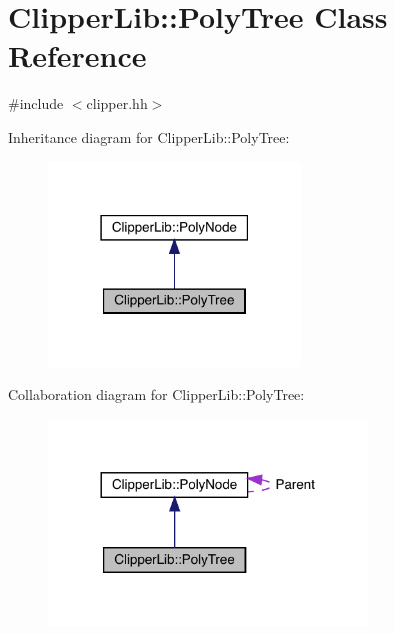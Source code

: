 \hypertarget{class_clipper_lib_1_1_poly_tree}{}\section{Clipper\+Lib\+::Poly\+Tree Class Reference}
\label{class_clipper_lib_1_1_poly_tree}


{\ttfamily \#include $<$clipper.\+hh$>$}



Inheritance diagram for Clipper\+Lib\+::Poly\+Tree\+:
\nopagebreak
\begin{figure}[H]
\begin{center}
\leavevmode
\includegraphics[width=190pt]{class_clipper_lib_1_1_poly_tree__inherit__graph}
\end{center}
\end{figure}


Collaboration diagram for Clipper\+Lib\+::Poly\+Tree\+:
\nopagebreak
\begin{figure}[H]
\begin{center}
\leavevmode
\includegraphics[width=240pt]{class_clipper_lib_1_1_poly_tree__coll__graph}
\end{center}
\end{figure}
